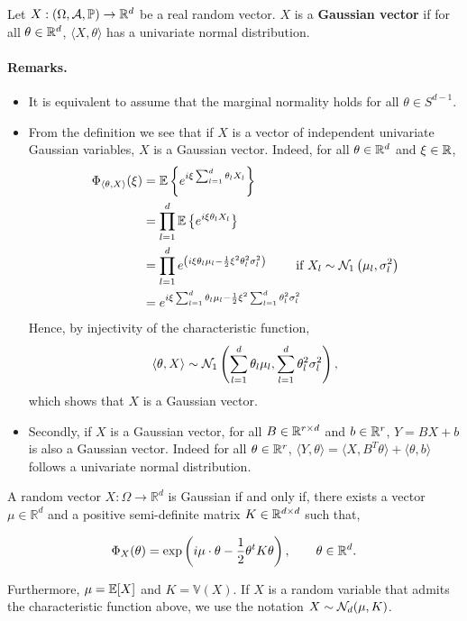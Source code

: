 \documentclass{article}
\begin{document}
\begin{definition}
  Let $X:(\Omega,\mathcal{A},\mathbb{P}) \to \mathbb{R}^{d}$ be a real random vector. $X$ is a \textbf{Gaussian
    vector} if for all $\theta \in \mathbb{R}^{d}$, $\langle X, \theta \rangle$ has a
  univariate normal distribution.
\end{definition}

\paragraph{Remarks.}

\begin{itemize}
\item It is equivalent to assume that the marginal normality holds for all
  $\theta \in S^{d-1}$.
\item From the definition we see that if $X$ is a vector of independent univariate
  Gaussian variables, $X$ is a Gaussian vector. Indeed, for all $\theta \in \mathbb{R}^{d}$
  and $\xi \in \mathbb{R}$, 
  $$
  \begin{aligned}
    \Phi_{\langle \theta,X \rangle}(\xi ) &=\mathbb{E}\left\{e^{i \xi \sum_{l=1}^{d} \theta_{l} X_{l}}\right\} \\
    &=\prod_{l=1}^{d} \mathbb{E}\left\{e^{i \xi \theta_{l} X_{l}}\right\} \\
    &=\prod_{l=1}^{d} e^{\left(i \xi \theta_{l} \mu_{l}-\frac{1}{2} \xi^{2} \theta_{l}^{2}
        \sigma_{l}^{2}\right)} \qquad \text { if } X_{l} \sim
    \mathcal{N}_{1}\left(\mu_{l}, \sigma_{l}^2 \right) \\
    &=e^{i \xi \sum_{l=1}^{d} \theta_{l} \mu_{l}-\frac{1}{2} \xi^{2} \sum_{l=1}^{d} \theta_{l}^{2} \sigma_{l}^{2}}
  \end{aligned}
  $$
  Hence, by injectivity of the characteristic function,
  $$
  \langle \theta,X \rangle \sim \mathcal{N}_{1}\left(\sum_{l=1}^d \theta_{l} \mu_{l}, \sum_{l=1}^d \theta_{l}^{2} \sigma_{l}^{2}\right),
  $$
  which shows that $X$ is a Gaussian vector.
\item Secondly, if $X$ is a Gaussian vector, for all $B \in \mathbb{R}^{r \times d}$ and $b
  \in \mathbb{R}^r$, $Y = BX + b$ is also a Gaussian vector. Indeed for all $\theta \in
  \mathbb{R}^r$, $\langle Y,\theta \rangle = \langle X,B^T\theta \rangle + \langle
  \theta,b \rangle$ follows a univariate normal distribution.
\end{itemize}

\begin{theorem} A random vector $X: \Omega \rightarrow \mathbb{R}^{d}$ is
  Gaussian if and only if, there exists a vector $\mu \in \mathbb{R}^{d}$ and a
  positive semi-definite matrix $K \in \mathbb{R}^{d \times d}$ such that, 
  
  \begin{equation} \label{eq:th}
    \Phi_{X}(\theta)=\exp \left(i \mu \cdot \theta-\frac{1}{2} \theta^t K \theta\right),
    \qquad \theta \in \mathbb{R}^{d}.
  \end{equation}
  
  Furthermore, $\mu = \mathbb{E}[X]$ and $K = \mathbb{V}(X)$. If $X$
  is a random variable that admits the characteristic function above, we use the
  notation $X \sim \mathcal{N}_d(\mu,K)$. 
\end{theorem}
\end{document}
